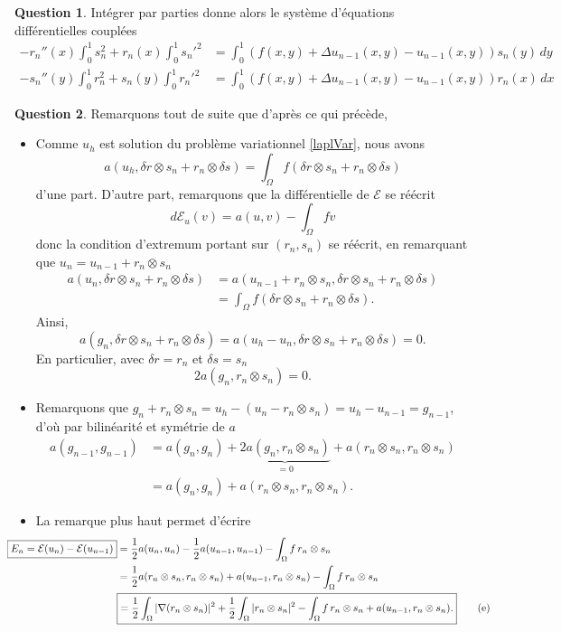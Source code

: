 \documentclass[11pt]{article}
\theoremstyle{definition}
\newtheorem{ques}{Question}
\theoremstyle{plain}
\begin{document}
\begin{ques}
Intégrer par parties donne alors le système d'équations différentielles couplées
\begin{align*}
-r_n''(x)\int_0^1 s_n^2 + r_n(x)\int_{0}^{1}{s_n'}^2 &= \int_{0}^{1}(f(x,y)+\Delta u_{n-1}(x,y) - u_{n-1}(x,y))s_n(y)\,dy \\
-s_n''(y)\int_0^1 r_n^2 + s_n(y)\int_{0}^{1}{r_n'}^2 &= \int_{0}^{1}(f(x,y)+\Delta u_{n-1}(x,y) - u_{n-1}(x,y))r_n(x)\,dx
\end{align*}


\end{ques}


\begin{ques}
Remarquons tout de suite que d'après ce qui précède, 

\begin{itemize}
\item Comme $u_h$ est solution du problème variationnel \eqref{laplVar}, nous avons
\[
a(u_h,\delta r\otimes s_n + r_n\otimes \delta s) = \int_\Omega f(\delta r\otimes s_n + r_n\otimes \delta s)
\]
d'une part. D'autre part, remarquons que la différentielle de $\mathcal{E}$ se réécrit
\[
d\mathcal{E}_u(v) = a(u,v) - \int_\Omega fv
\]
donc la condition d'extremum portant sur $(r_n,s_n)$ se réécrit, en remarquant que $u_n = u_{n-1} + r_n\otimes s_n$
\begin{align*}
a(u_n,\delta r\otimes s_n + r_n\otimes\delta s) &=
a(u_{n-1}+r_n\otimes s_n, \delta r\otimes s_n + r_n\otimes\delta s) \\
&= \int_\Omega f(\delta r\otimes s_n + r_n\otimes\delta s).
\end{align*}
Ainsi,
\[
\boxed{a(g_n,\delta r\otimes s_n + r_n\otimes\delta s) = a(u_h-u_n,\delta r\otimes s_n + r_n\otimes\delta s) = 0.}
\]
En particulier, avec $\delta r = r_n$ et $\delta s= s_n$
\[
2a(g_n,r_n\otimes s_n) = 0.
\]

\item Remarquons que $g_n + r_n\otimes s_n = u_h - (u_n - r_n\otimes s_n) = u_h - u_{n-1} = g_{n-1}$, d'où par bilinéarité et symétrie de $a$
\begin{align*}
\boxed{a(g_{n-1},g_{n-1})} 
&= a(g_n,g_n) + \underbrace{2a(g_n,r_n\otimes s_n)}_{=0} + a(r_n\otimes s_n,r_n\otimes s_n) \\
&\boxed{= a(g_n,g_n) + a(r_n\otimes s_n,r_n\otimes s_n).}
\end{align*}

\item La remarque plus haut permet d'écrire
\begin{align*}\hspace*{-1cm}
\boxed{E_n = \mathcal{E}(u_n) - \mathcal{E}(u_{n-1})}
&= \frac 12a(u_n,u_n) - \frac 12 a(u_{n-1},u_{n-1}) - \int_\Omega f\, r_n\otimes s_n \\
&= \frac 12 a(r_n\otimes s_n,r_n\otimes s_n) + a(u_{n-1},r_n\otimes s_n) - \int_\Omega f\, r_n\otimes s_n \\
&\boxed{= \frac 12\int_\Omega |\nabla(r_n\otimes s_n)|^2 + \frac 12\int_\Omega |r_n\otimes s_n|^2 - \int_\Omega f\, r_n\otimes s_n + a(u_{n-1},r_n\otimes s_n).}\tag{e}\label{eq:e}
\end{align*}


\end{itemize}
\end{ques}
\end{document}
